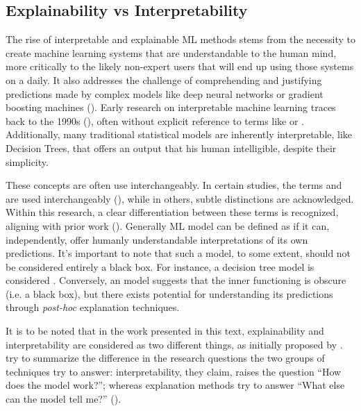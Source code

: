 \documentclass[binding=0.6cm]{sapthesis}
\newcommand{\mycite}[1]{(\cite{#1})}
\begin{document}
\subsection{Explainability vs Interpretability}
\label{sec:bg.xai.inter-vs-xai}
The rise of interpretable and explainable ML methods stems from the necessity to create machine learning systems that are understandable to the human mind, more critically to the likely non-expert users that will end up using those systems on a daily. It also addresses the challenge of comprehending and justifying predictions made by complex models like deep neural networks or gradient boosting machines \mycite{mason1999-nips-grad-desc,friedman2001-greedy-desc}. Early research on interpretable machine learning traces back to the 1990s \mycite{rudin2019-stop-epxlaining-black-box}, often without explicit reference to terms like  or . Additionally, many traditional statistical models are inherently interpretable, like Decision Trees, that offers an output that his human intelligible, despite their simplicity.

These concepts are often use interchangeably. In certain studies, the terms  and  are used interchangeably \mycite{molnar2022}, while in others, subtle distinctions are acknowledged. Within this research, a clear differentiation between these terms is recognized, aligning with prior work \mycite{rudin2019-stop-epxlaining-black-box}. Generally ML model can be defined as  if it can, independently, offer humanly understandable interpretations of its own predictions. It's important to note that such a model, to some extent, should not be considered entirely a black box. For instance, a decision tree model is considered . Conversely, an  model suggests that the inner functioning is obscure (i.e. a black box), but there exists potential for understanding its predictions through \textit{post-hoc} explanation techniques.

It is to be noted that in the work presented in this text, explainability and interpretability are considered as two different things, as initially proposed by \cite{rudin2019-stop-epxlaining-black-box}. \cite{lipton2017-mythos} try to summarize the difference in the research questions the two groups of techniques try to answer: interpretability, they claim, raises the question “How does the model work?”; whereas explanation methods try to answer “What else can the model tell me?” \mycite{marcinkevičs2023-inter-vs-XAI}.
\end{document}
